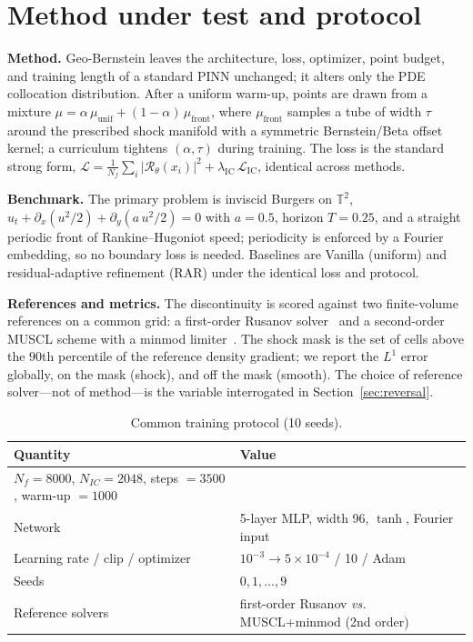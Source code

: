 \documentclass[11pt]{article}
\begin{document}
\section{Method under test and protocol}\label{sec:protocol}
\textbf{Method.} Geo-Bernstein leaves the architecture, loss, optimizer, point
budget, and training length of a standard PINN unchanged; it alters only the PDE
collocation distribution. After a uniform warm-up, points are drawn from a mixture
$\mu = \alpha\,\mu_{\mathrm{unif}} + (1-\alpha)\,\mu_{\mathrm{front}}$, where
$\mu_{\mathrm{front}}$ samples a tube of width $\tau$ around the prescribed shock
manifold with a symmetric Bernstein/Beta offset kernel; a curriculum tightens
$(\alpha,\tau)$ during training. The loss is the standard strong form,
$\mathcal{L}=\frac1{N_f}\sum_i|\mathcal{R}_\theta(x_i)|^2
+\lambda_{\mathrm{IC}}\,\mathcal{L}_{\mathrm{IC}}$, identical across methods.

\textbf{Benchmark.} The primary problem is inviscid Burgers on $\mathbb{T}^2$,
$u_t+\partial_x(u^2/2)+\partial_y(a\,u^2/2)=0$ with $a=0.5$, horizon $T=0.25$, and
a straight periodic front of Rankine--Hugoniot speed; periodicity is enforced by a
Fourier embedding, so no boundary loss is needed. Baselines are Vanilla (uniform)
and residual-adaptive refinement (RAR) under the identical loss and protocol.

\textbf{References and metrics.} The discontinuity is scored against two
finite-volume references on a common grid: a first-order Rusanov solver~\cite{Rusanov1961} and a
second-order MUSCL scheme with a minmod limiter~\cite{vanLeer1979}. The shock mask is the set of
cells above the $90$th percentile of the reference density gradient; we report the
$L^1$ error globally, on the mask (shock), and off the mask (smooth). The choice of
reference solver---not of method---is the variable interrogated in
Section~\ref{sec:reversal}.
\begin{table}[t]\centering
\caption{Common training protocol (10 seeds).}\label{tab:protocol}
\begin{tabular}{ll}\toprule
Quantity & Value \\ \midrule
$N_f=8000$, $N_{IC}=2048$, steps $=3500$, warm-up $=1000$ & \\
Network & 5-layer MLP, width 96, $\tanh$, Fourier input \\
Learning rate / clip / optimizer & $10^{-3}\!\to\!5\times10^{-4}$ / 10 / Adam \\
Seeds & $0,1,\dots,9$ \\
Reference solvers & first-order Rusanov \emph{vs.} MUSCL+minmod (2nd order) \\
\bottomrule
\end{tabular}
\end{table}
\end{document}
